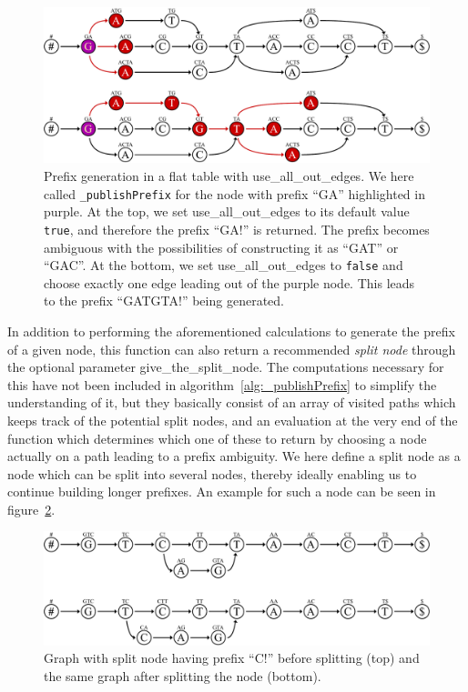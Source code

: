 \documentclass[a4paper,12pt,twoside,BCOR=10mm]{scrbook}
\begin{document}
\begin{figure}[!htb]
\centering
\includegraphics[width=\textwidth]{evo_fig_use_all_out_edges_or_not.pdf}
\caption[Prefix generation in a flat table with use\_all\_out\_edges]{Prefix generation in a flat table with \textup{use\_all\_out\_edges}. We here called \textup{\texttt{\_publishPrefix}} for the node with prefix \textup{“GA”} highlighted in purple. At the top, we set \textup{use\_all\_out\_edges} to its default value \textup{\texttt{true}}, and therefore the prefix \textup{“GA!”} is returned. The prefix becomes ambiguous with the possibilities of constructing it as \textup{“GAT”} or \textup{“GAC”}. At the bottom, we set \textup{use\_all\_out\_edges} to \textup{\texttt{false}} and choose exactly one edge leading out of the purple node. This leads to the prefix \textup{“GATGTA!”} being generated.} \label{fig:evo_fig_use_all_out_edges_or_not}
\end{figure}
In addition to performing the aforementioned calculations to generate the prefix of a given node, 
this function can also return a recommended \textit{split node} through the optional parameter give\_the\_split\_node. 
The computations necessary for this have not been included in algorithm~\ref{alg:_publishPrefix} to simplify 
the understanding of it, but they basically consist of an array of visited paths which keeps track 
of the potential split nodes, and an evaluation at the very end of the function which determines 
which one of these to return by choosing a node actually on a path leading to a prefix ambiguity. 
We here define a split node as a node which can be split into several nodes, thereby ideally enabling us 
to continue building longer prefixes. 
An example for such a node can be seen in figure~\ref{fig:evo_split_node}. 
\begin{figure}[!htb]
\centering
\includegraphics[width=\textwidth]{evo_split_node.pdf}
\caption[Graph with split node before and after splitting]{Graph with split node having prefix \textup{“C!”} before splitting (top) and the same graph after splitting the node (bottom).} \label{fig:evo_split_node}
\end{figure}
\end{document}
